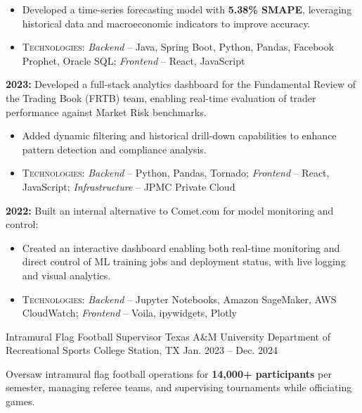 \begin{cventries}
{\begin{cvitems}
{\begin{itemize}
            \item Developed a time-series forecasting model with \textbf{5.38\% SMAPE}, leveraging historical data and macroeconomic indicators to improve accuracy.
            \item \textsc{Technologies}: \textit{Backend} – Java, Spring Boot, Python, Pandas, Facebook Prophet, Oracle SQL; \textit{Frontend} – React, JavaScript
          \end{itemize}
            }
            \item { \textbf{2023:} Developed a full-stack analytics dashboard for the Fundamental Review of the Trading Book (FRTB) team, enabling real-time evaluation of trader performance against Market Risk benchmarks.
            \begin{itemize}
            \item Added dynamic filtering and historical drill-down capabilities to enhance pattern detection and compliance analysis.            
            \item \textsc{Technologies}: \textit{Backend} – Python, Pandas, Tornado; \textit{Frontend} – React, JavaScript; \textit{Infrastructure} – JPMC Private Cloud
            \end{itemize}
            }
            \item{ \textbf{2022:} Built an internal alternative to Comet.com for model monitoring and control:
            \begin{itemize}
                \item Created an interactive dashboard enabling both real-time monitoring and direct control of ML training jobs and deployment status, with live logging and visual analytics.
                \item \textsc{Technologies}: \textit{Backend} – Jupyter Notebooks, Amazon SageMaker, AWS CloudWatch; \textit{Frontend} – Voila, ipywidgets, Plotly
            \end{itemize}
            } 
          \end{cvitems}
        }
\cventry
  {Intramural Flag Football Supervisor} %
  {Texas A\&M University Department of Recreational Sports} %
  {College Station, TX} %
  {Jan. 2023 -- Dec. 2024} %
  {
    \begin{cvitems}
      \item{Oversaw intramural flag football operations for \textbf{14,000+ participants} per semester, managing referee teams, and supervising tournaments while officiating games.
}
\end{cvitems}}
\end{cventries}
